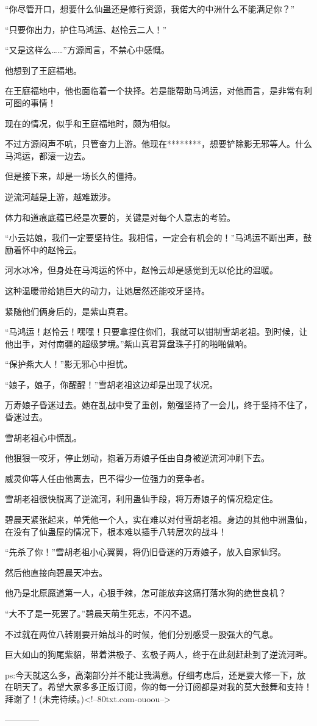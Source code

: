 \begin{this_body}
“你尽管开口，想要什么仙蛊还是修行资源，我偌大的中洲什么不能满足你？”

“只要你出力，护住马鸿运、赵怜云二人！”

“又是这样么……”方源闻言，不禁心中感慨。

他想到了王庭福地。

在王庭福地中，他也面临着一个抉择。若是能帮助马鸿运，对他而言，是非常有利可图的事情！

现在的情况，似乎和王庭福地时，颇为相似。

不过方源闷声不吭，只管奋力上游。他现在********，想要铲除影无邪等人。什么马鸿运，都滚一边去。

但是接下来，却是一场长久的僵持。

逆流河越是上游，越难跋涉。

体力和道痕底蕴已经是次要的，关键是对每个人意志的考验。

“小云姑娘，我们一定要坚持住。我相信，一定会有机会的！”马鸿运不断出声，鼓励着怀中的赵怜云。

河水冰冷，但身处在马鸿运的怀中，赵怜云却是感觉到无以伦比的温暖。

这种温暖带给她巨大的动力，让她居然还能咬牙坚持。

紧随他们俩身后的，是紫山真君。

“马鸿运！赵怜云！嘿嘿！只要拿捏住你们，我就可以钳制雪胡老祖。到时候，让他出手，对付南疆的超级梦境。”紫山真君算盘珠子打的啪啪做响。

“保护紫大人！”影无邪心中担忧。

“娘子，娘子，你醒醒！”雪胡老祖这边却是出现了状况。

万寿娘子昏迷过去。她在乱战中受了重创，勉强坚持了一会儿，终于坚持不住了，昏迷过去。

雪胡老祖心中慌乱。

他狠狠一咬牙，停止划动，抱着万寿娘子任由自身被逆流河冲刷下去。

威灵仰等人任由他离去，巴不得少一位强力的竞争者。

雪胡老祖很快脱离了逆流河，利用蛊仙手段，将万寿娘子的情况稳定住。

碧晨天紧张起来，单凭他一个人，实在难以对付雪胡老祖。身边的其他中洲蛊仙，在没有了仙蛊屋的情况下，根本难以插手八转层次的战斗！

“先杀了你！”雪胡老祖小心翼翼，将仍旧昏迷的万寿娘子，放入自家仙窍。

然后他直接向碧晨天冲去。

他乃是北原魔道第一人，心狠手辣，怎可能放弃这痛打落水狗的绝世良机？

“大不了是一死罢了。”碧晨天萌生死志，不闪不退。

不过就在两位八转刚要开始战斗的时候，他们分别感受一股强大的气息。

巨大如山的狗尾紫貂，带着洪极子、玄极子两人，终于在此刻赶赴到了逆流河畔。

ps:今天就这么多，高潮部分并不能让我满意。仔细考虑后，还是要大修一下，放在明天了。希望大家多多正版订阅，你的每一分订阅都是对我的莫大鼓舞和支持！拜谢了！(未完待续。)<!--80txt.com-ouoou-->

------------

\end{this_body}

